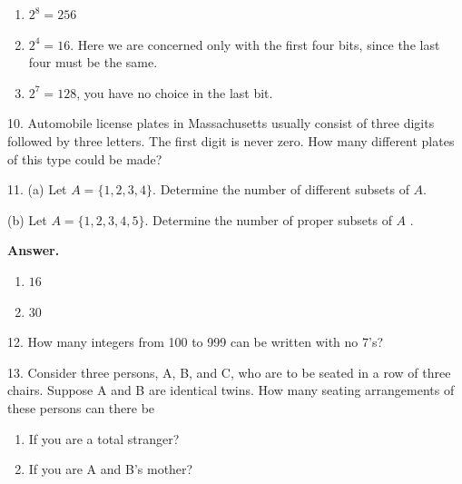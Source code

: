 \documentclass[10pt,]{book}
\theoremstyle{plain}
\theoremstyle{definition}
\theoremstyle{definition}
\theoremstyle{definition}
\begin{document}
\begin{exercisegroup}
\begin{enumerate}[label=\alph*]
\item\hypertarget{li-1}{} \(2^8=256\)%
\item\hypertarget{li-2}{} \(2^4=16\). Here we are concerned only with the first four bits, since the last four must be the same.%
\item\hypertarget{li-3}{} \(2^7=128\), you have no choice in the last bit.%
\end{enumerate}
%
\item[10.]\hypertarget{exercise-10}{} Automobile license plates in Massachusetts usually consist of three digits followed by three letters. The first digit is never zero. How many different plates of this type could be made?%
\par\smallskip
\item[11.]\hypertarget{exercise-11}{} (a) Let \(A = \{1, 2, 3, 4\}\). Determine the number of different subsets of \(A\).%
\par
 (b) Let \(A = \{1, 2, 3, 4, 5\}\). Determine the number of proper subsets of \(A\) .%
\par\smallskip
\par\smallskip
\noindent\textbf{Answer.}\hypertarget{answer-6}{}\quad
\leavevmode%
\begin{multicols}{2}
\begin{enumerate}[label=\alph*]
\item\hypertarget{li-4}{}\(16\)%
\item\hypertarget{li-5}{} \(30\)%
\end{enumerate}
\end{multicols}
%
\item[12.]\hypertarget{exercise-12}{} How many integers from 100 to 999 can be written with no 7's?%
\par\smallskip
\item[13.]\hypertarget{exercise-13}{} Consider three persons, A, B, and C, who are to be seated in a row of three chairs. Suppose A and B are identical twins. How many seating arrangements of these persons can there be%
\par
\leavevmode%
\begin{multicols}{2}
\begin{enumerate}[label=\alph*]
\item\hypertarget{li-6}{} If you are a total stranger?%
\item\hypertarget{li-7}{} If you are A and B's mother?%
\end{enumerate}
\end{multicols}
%
\par

\end{exercisegroup}
\end{document}
